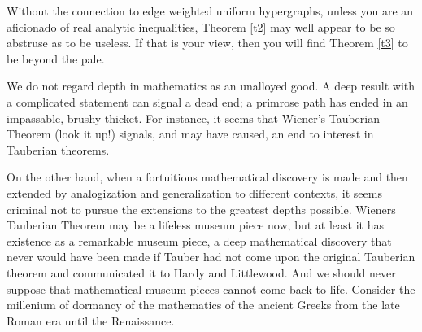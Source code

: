 \documentclass[final,1p,times]{elsarticle}
\begin{document}
Without the connection to edge weighted uniform hypergraphs, unless you are an aficionado of real analytic inequalities, Theorem \ref {t2} may well appear to be so abstruse as to be useless.  If that is your view, then you will find Theorem \ref {t3} to be beyond the pale.

We do not regard depth in mathematics as an unalloyed good.  A deep result with a complicated statement can signal a dead end; a primrose path has ended in an impassable, brushy thicket.  For instance, it seems that Wiener's Tauberian Theorem (look it up!) signals, and may have caused, an end to interest in Tauberian theorems.

On the other hand, when a fortuitions mathematical discovery is made and then extended by analogization and generalization to different contexts, it seems criminal not to pursue the extensions to the greatest depths possible.  Wieners Tauberian Theorem may be a lifeless museum piece now, but at least it has existence as a remarkable museum piece, a deep mathematical discovery that never would have been made if Tauber had not come upon the original Tauberian theorem and communicated it to Hardy and Littlewood.  And we should never suppose that mathematical museum pieces cannot come back to life.  Consider the millenium of dormancy of the mathematics of the ancient Greeks from the late Roman era until the Renaissance.
\end{document}
